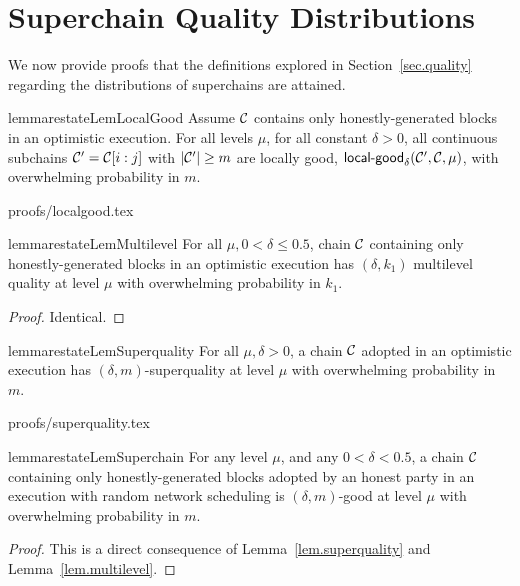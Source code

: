 \section{Superchain Quality Distributions}
\label{sec.app-quality}

We now provide proofs that the definitions explored in Section~\ref{sec.quality}
regarding the distributions of superchains are attained.

\begin{restatable}{lemma}{restateLemLocalGood}
\label{lem.localgood}
Assume $\mathcal{C}$ contains only honestly-generated blocks in an optimistic
execution. For all levels $\mu$, for all constant $\delta > 0$, all continuous
subchains $\mathcal{C}' = \mathcal{C}[i:j]$ with $|\mathcal{C}'| \geq m$ are locally good,
$\textsf{local-good}_{\delta}(\mathcal{C}', \mathcal{C}, \mu)$, with overwhelming
probability in $m$.
\end{restatable}
{proofs/localgood.tex}

\begin{restatable}{lemma}{restateLemMultilevel}
\label{lem.multilevel}
For all $\mu, 0 < \delta \leq 0.5$, chain $\mathcal{C}$ containing only
honestly-generated blocks in an optimistic execution has $(\delta, k_1)$
multilevel quality at level $\mu$ with overwhelming probability in $k_1$.
\end{restatable}
\begin{proof}
Identical.
\Qed
\end{proof}

\begin{restatable}[Superquality]{lemma}{restateLemSuperquality}
\label{lem.superquality}
For all $\mu, \delta > 0$, a chain $\mathcal{C}$ adopted in an optimistic execution
has $(\delta, m)$-superquality at level $\mu$ with overwhelming probability in
$m$.
\end{restatable}
{proofs/superquality.tex}

\begin{restatable}{lemma}{restateLemSuperchain}
\label{lem.superchain-distribution}
For any level $\mu$, and any $0 < \delta < 0.5$, a chain
$\mathcal{C}$ containing only honestly-generated blocks adopted by an honest party in
an execution with random network scheduling is $(\delta, m)$-good at level
$\mu$ with overwhelming probability in $m$.
\end{restatable}
\begin{proof}
This is a direct consequence of Lemma~\ref{lem.superquality} and
Lemma~\ref{lem.multilevel}. \Qed
\end{proof}
